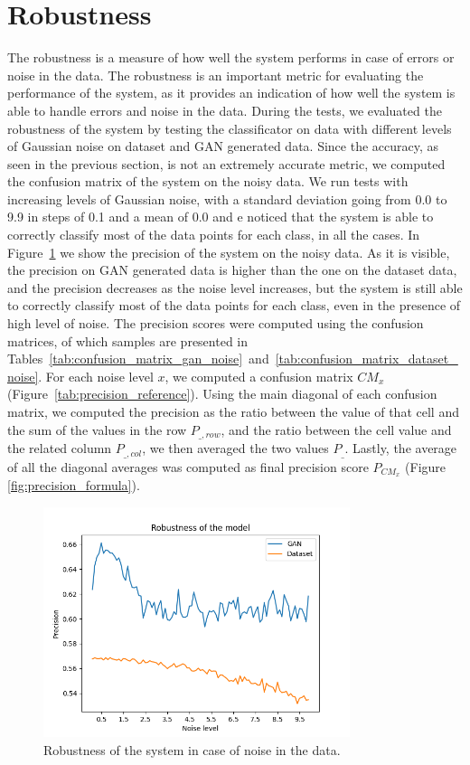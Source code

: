 \section{Robustness}
The robustness is a measure of how well the system performs in case of errors or noise in the data.
The robustness is an important metric for evaluating the performance of the system, as it provides an indication of how well the system is able to handle errors and noise in the data.
During the tests, we evaluated the robustness of the system by testing the classificator on data with different levels of Gaussian noise on dataset and GAN generated data.
Since the accuracy, as seen in the previous section, is not an extremely accurate metric, we computed the confusion matrix of the system on the noisy data.
We run tests with increasing levels of Gaussian noise, with a standard deviation going from 0.0 to 9.9 in steps of 0.1 and a mean of 0.0 and e noticed that the system is able to correctly classify most of the data points for each class, in all the cases.
In Figure~\ref{fig:robustness} we show the precision of the system on the noisy data.
As it is visible, the precision on GAN generated data is higher than the one on the dataset data, and the precision decreases as the noise level increases, but the system is still able to correctly classify most of the data points for each class, even in the presence of high level of noise.
The precision scores were computed using the confusion matrices, of which samples are presented in Tables~\ref{tab:confusion_matrix_gan_noise}~and~\ref{tab:confusion_matrix_dataset_noise}.
For each noise level $x$, we computed a confusion matrix $CM_x$ (Figure~\ref{tab:precision_reference}).
Using the main diagonal of each confusion matrix, we computed the precision as the ratio between the value of that cell and the sum of the values in the row $P_{\_, row}$, and the ratio between the cell value and the related column $P_{\_, col}$, we then averaged the two values $P_{\_}$.
Lastly, the average of all the diagonal averages was computed as final precision score $P_{CM_x}$ (Figure \ref{fig:precision_formula}).

\begin{figure}[!htbp]
    \centering
    \includegraphics[width=0.8\textwidth]{Figures/Testing/robustness_plot}
    \caption{Robustness of the system in case of noise in the data.}\label{fig:robustness}
\end{figure}

